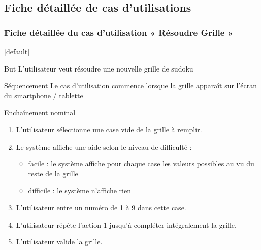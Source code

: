 \documentclass{beamer}
\begin{document}
\subsection{Fiche détaillée de cas d’utilisations}
\begin{frame}
  \frametitle{Fiche détaillée du cas d'utilisation « Résoudre Grille »}
  [default]
  \begin{block}{\footnotesize{But}}
\scriptsize{L'utilisateur veut résoudre une nouvelle grille de sudoku}
  \end{block}
  \pause
  \begin{block}{\footnotesize{Séquencement}}
\scriptsize{Le cas d'utilisation commence lorsque la grille apparaît sur l'écran du
    smartphone / tablette}
  \end{block}
  \pause
  \begin{block}{\footnotesize{Enchaînement nominal}}
    \begin{enumerate}    
      [circle]
    \item
      \scriptsize{L'utilisateur sélectionne une case vide de la grille à remplir.}
    \item
      \scriptsize{Le système affiche une aide selon le niveau de difficulté :}
      \begin{itemize}
        [circle]
      \item
        \scriptsize{facile : le système affiche pour chaque case les valeurs possibles au vu du
        reste de la grille}
      \item
        \scriptsize{difficile : le système n'affiche rien}
      \end{itemize}
    \item
      \scriptsize{L'utilisateur entre un numéro de 1 à 9 dans cette case.}
    \item
      \scriptsize{L'utilisateur répète l'action 1 jusqu'à compléter intégralement la grille.}
    \item
      \scriptsize{L'utilisateur valide la grille.}
    \end{enumerate}
  \end{block}
\end{frame}
\end{document}
